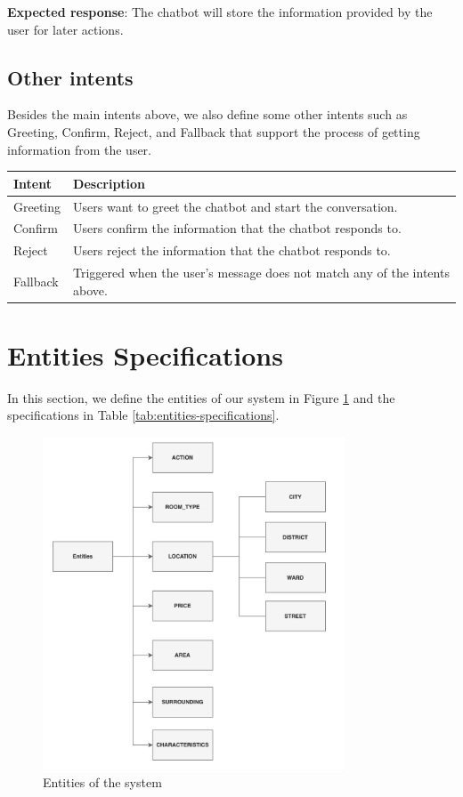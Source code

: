 \noindent \textbf{Expected response}: The chatbot will store the information provided by the user for later actions.

\subsection{Other intents}
Besides the main intents above, we also define some other intents such as Greeting, Confirm, Reject, and Fallback that support the process of getting information from the user. 

{\renewcommand{\arraystretch}{1.75}%
\begin{table}[ht]
    \centering
    \begin{tabular}{|l|l|}
        \hline
        \textbf{Intent} & \textbf{Description} \\ \hline
        Greeting & Users want to greet the chatbot and start the conversation. \\ \hline
        Confirm & Users confirm the information that the chatbot responds to. \\ \hline
        Reject & Users reject the information that the chatbot responds to. \\ \hline
        Fallback & Triggered when the user's message does not match any of the intents above.  \\ \hline
    \end{tabular}
\end{table}}

\section{Entities Specifications}
In this section, we define the entities of our system in Figure \ref{fig:entities} and the specifications in Table \ref{tab:entities-specifications}.

\begin{figure}[ht]
    \centering
    \includegraphics[width=0.8\textwidth]{../Images/7.System_Modeling/entities.png}
    \caption{Entities of the system}
    \label{fig:entities}
\end{figure}

